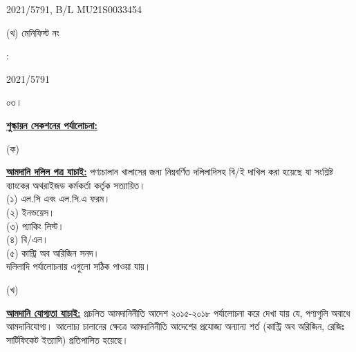 \documentclass[12pt]{article}
\newcommand{\menifest}{2021/5791}
\newcommand{\blno}{MU21S0033454}
\begin{document}
\begin{minipage}[t]{0.53\linewidth}
{\menifest}, B/L {\blno}
\\
\end{minipage}
\begin{minipage}[t]{0.05\linewidth}
\hspace*{1em}
\end{minipage}
\begin{minipage}[t]{0.40\linewidth}
(থ) মেনিফিস্ট নং
\end{minipage}
\begin{minipage}[t]{0.02\linewidth}
:
\end{minipage}
\begin{minipage}[t]{0.53\linewidth}
{\menifest}
\\
\end{minipage}
\normalsize
\begin{minipage}[t]{0.05\linewidth}
০৩।
\end{minipage}
\begin{minipage}[t]{0.95\linewidth}
\underline{\textbf{শুল্কায়ন সেকশনের পর্যালোচনা:}}
\end{minipage}
\begin{minipage}[t]{0.05\linewidth}
\hspace{1em}
\end{minipage}
\begin{minipage}[t]{0.05\linewidth}
(ক)
\end{minipage}
\begin{minipage}[t]{0.90\linewidth}
\underline{\textbf{আমদানি দলিল পত্র যাচাই:}}
পণ্যচালান খালাসের জন্য নিম্নবর্ণিত দলিলাদিসহ বি/ই দাখিল করা
হয়েছে যা সংশ্লিষ্ট ব্যাংকের অথরাইজড কর্মকর্তা কর্তৃক সত্যায়িত।
\\
(১) এল.সি এবং এল.সি.এ ফরম।
\\
(২) ইনভয়েস।
\\
(৩) প্যাকিং লিস্ট।
\\
(৪) বি/এল।
\\
(৫) কান্ট্রি অব অরিজিন সনদ।
\\
দলিলাদি পর্যালোচনায় এগুলো
সঠিক পাওয়া যায়।
\\
\end{minipage}
\begin{minipage}[t]{0.05\linewidth}
\hspace{1em}
\end{minipage}
\begin{minipage}[t]{0.05\linewidth}
(খ)
\end{minipage}
\begin{minipage}[t]{0.90\linewidth}
\underline{\textbf{আমদানি যোগ্যতা যাচাই:}}
প্রচলিত আমদানিনীতি আদেশ ২০১৫-২০১৮ পর্যালোচনা করে দেখা যায় যে, পণ্যগুলি অবাধে আমদানিযোগ্য।
আলোচ্য চালানের ক্ষেত্রে আমদানিনীতি আদেশের প্রযোজ্য অন্যান্য শর্ত (কান্ট্রি অব অরিজিন, রেজিঃ
সার্টিফিকেট ইত্যাদি) প্রতিপালিত হয়েছে।
\\
\end{minipage}
\end{document}
